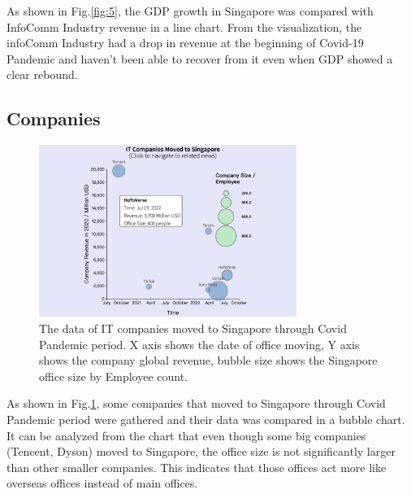 \documentclass[conference]{IEEEtran}
\begin{document}
As shown in Fig.\ref{fig:5}, the GDP growth in Singapore was compared with InfoComm Industry revenue in a line chart. From the visualization, the infoComm Industry had a drop in revenue at the beginning of Covid-19 Pandemic and haven’t been able to recover from it even when GDP showed a clear rebound.

\subsection{Companies}

\begin{figure}[H]
\centering
\includegraphics[width=3.3in]{6}
\caption{The data of IT companies moved to Singapore through Covid Pandemic period. X axis shows the date of office moving, Y axis shows the company global revenue, bubble size shows the Singapore office size by Employee count.}
\label{fig:6}
\end{figure}

As shown in Fig.\ref{fig:6}, some companies that moved to Singapore through Covid Pandemic period were gathered and their data was compared in a bubble chart. It can be analyzed from the chart that even though some big companies (Tencent, Dyson) moved to Singapore, the office size is not significantly larger than other smaller companies. This indicates that those offices act more like overseas offices instead of main offices.





 
\end{document}
